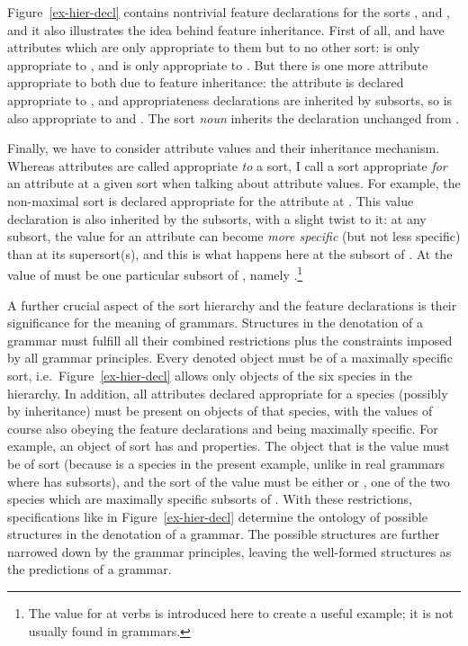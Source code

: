 \documentclass[output=paper
 	        ,biblatex
                ,babelshorthands
                ,newtxmath
                ,draftmode
                ,colorlinks, citecolor=brown
]{langscibook}
\begin{document}
Figure~\ref{ex-hier-decl} contains nontrivial feature declarations for the sorts
,  and , and it also illustrates
the idea behind feature inheritance. First of all,  and
 have attributes which are only appropriate to them but to
no other sort:  is only appropriate to ,
and  is only appropriate to . But there is
one more attribute appropriate to both due to feature inheritance:
the attribute  is declared appropriate to ,
and appropriateness declarations are inherited by subsorts, so 
is also appropriate to  and . The sort \emph{noun}
inherits the declaration unchanged from .

Finally, we have to consider attribute values and their inheritance
mechanism. Whereas attributes are called appropriate \emph{to} a sort,
I call a sort appropriate \emph{for} an attribute at a given sort when
talking about attribute values. For example, the non-maximal sort
 is declared appropriate for the attribute 
at . This value declaration is also inherited by the
subsorts, with a slight twist to it: at any subsort, the value for an
attribute can become \emph{more specific} (but not less specific) than
at its supersort(s), and this is what happens here at the subsort
 of .  At  the value of
 must be one particular subsort of , namely
.\footnote{The  value for  at verbs
  is introduced here to create a useful example; it is not usually
found in grammars.}

A further crucial aspect of the sort hierarchy and the feature declarations is their significance
for the meaning of grammars. Structures\label{page-wellformedness-linguistic-objects} in the
denotation of a grammar must fulfill all their combined restrictions plus the constraints imposed by
all grammar principles. Every denoted object must be of a maximally specific sort, i.e.\
Figure~\ref{ex-hier-decl} allows only objects of the six species in the hierarchy. In addition, all
attributes declared appropriate for a species (possibly by inheritance) must be present on objects
of that species, with the values of course also obeying the feature declarations and being maximally
specific. For example, an object of sort \type{noun} has  and \feat{prd} properties. The
object that is the \feat{case} value must be of sort  (because \type{case} is a species
in the present example, unlike in real grammars where \type{case} has subsorts), and the sort of the
\feat{prd} value must be either \type{plus} or \type{minus}, one of the two species which are
maximally specific subsorts of \type{boolean}.  With these restrictions, specifications like in
Figure~\ref{ex-hier-decl} determine the ontology of possible structures in the denotation of a
grammar. The possible structures are further narrowed down by the grammar principles, leaving the
well-formed structures as the predictions of a grammar.
\end{document}
